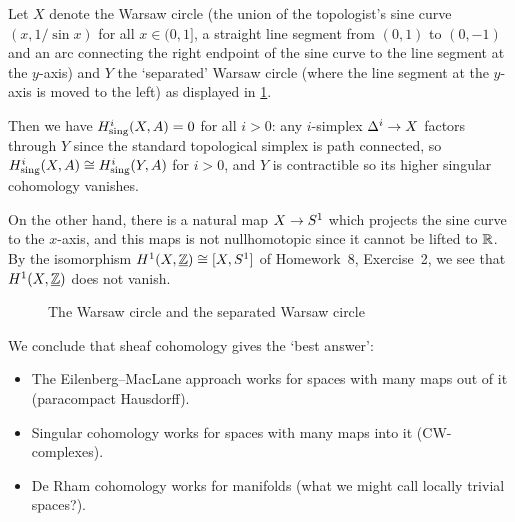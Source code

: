 \begin{exmp}
Let \(X\) denote the Warsaw circle (the union of the topologist's sine curve \((x,1/\sin x)\) for all \(x\in(0,1]\), a straight line segment from \((0,1)\) to \((0,-1)\) and an arc connecting the right endpoint of the sine curve to the line segment at the \(y\)-axis) and \(Y\) the `separated' Warsaw circle (where the line segment at the \(y\)-axis is moved to the left) as displayed in \cref{fig:Warsaw-circle}.

Then we have \(H^i_{\smash{\textup{sing}}}(X,A)=0\) for all \(i>0\): any \(i\)-simplex \(\simplex[i]\to X\) factors through \(Y\) since the standard topological simplex is path connected, so \(H^i_{\smash{\textup{sing}}}(X,A)\cong H^i_{\textup{sing}}(Y,A)\) for \(i>0\), and \(Y\) is contractible so its higher singular cohomology vanishes.

On the other hand, there is a natural map \(X\to\sphere[1]\) which projects the sine curve to the \(x\)-axis, and this maps is not nullhomotopic since it cannot be lifted to \(\mathbb{R}\).
By the isomorphism \(H^1(X,\underline{\bb Z})\cong [X,\sphere[1]]\) of Homework~8, Exercise~2, we see that \(H^1(X,\underline{\mathbb{Z}})\) does not vanish.
\begin{figure}
  \centering
  \caption{The Warsaw circle and the separated Warsaw circle}
  \label{fig:Warsaw-circle}
\end{figure}
\end{exmp}

We conclude that sheaf cohomology gives the `best answer':
\begin{itemize}
\item The Eilenberg--MacLane approach works for spaces with many maps out of it (paracompact Hausdorff).
\item Singular cohomology works for spaces with many maps into it (CW-complexes).
\item De Rham cohomology works for manifolds (what we might call locally trivial spaces?).
\end{itemize}

